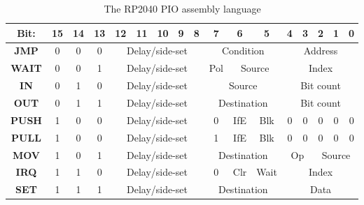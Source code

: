 \begin{table}[h!]
    \begin{tabular}{|c|c|c|c|c|c|c|c|c|c|c|c|c|c|c|c|c|}
        \hline
        \textbf{Bit:} & 15 & 14 & 13 & 12                                  & 11                               & 10                             & 9                           & 8                          & 7 & 6 & 5 & 4 & 3 & 2 & 1 & 0 \\ \hline
        \textbf{JMP}  & 0  & 0  & 0  & \multicolumn{5}{c|}{Delay/side-set} & \multicolumn{3}{c|}{Condition}   & \multicolumn{5}{c|}{Address}                                                                                              \\ \hline
        \textbf{WAIT} & 0  & 0  & 1  & \multicolumn{5}{c|}{Delay/side-set} & Pol                              & \multicolumn{2}{c|}{Source}    & \multicolumn{5}{c|}{Index}                                                               \\ \hline
        \textbf{IN}   & 0  & 1  & 0  & \multicolumn{5}{c|}{Delay/side-set} & \multicolumn{3}{c|}{Source}      & \multicolumn{5}{c|}{Bit count}                                                                                            \\ \hline
        \textbf{OUT}  & 0  & 1  & 1  & \multicolumn{5}{c|}{Delay/side-set} & \multicolumn{3}{c|}{Destination} & \multicolumn{5}{c|}{Bit count}                                                                                            \\ \hline
        \textbf{PUSH} & 1  & 0  & 0  & \multicolumn{5}{c|}{Delay/side-set} & 0                                & IfE                            & Blk                         & 0                          & 0 & 0 & 0 & 0                 \\ \hline
        \textbf{PULL} & 1  & 0  & 0  & \multicolumn{5}{c|}{Delay/side-set} & 1                                & IfE                            & Blk                         & 0                          & 0 & 0 & 0 & 0                 \\ \hline
        \textbf{MOV}  & 1  & 0  & 1  & \multicolumn{5}{c|}{Delay/side-set} & \multicolumn{3}{c|}{Destination} & \multicolumn{2}{c|}{Op}        & \multicolumn{3}{c|}{Source}                                                              \\ \hline
        \textbf{IRQ}  & 1  & 1  & 0  & \multicolumn{5}{c|}{Delay/side-set} & 0                                & Clr                            & Wait                        & \multicolumn{5}{c|}{Index}                                 \\ \hline
        \textbf{SET}  & 1  & 1  & 1  & \multicolumn{5}{c|}{Delay/side-set} & \multicolumn{3}{c|}{Destination} & \multicolumn{5}{c|}{Data}                                                                                                 \\ \hline
    \end{tabular}
    \caption{The RP2040 PIO assembly language \cite{rp2040}}
    \label{tab:pioasm}
\end{table}

